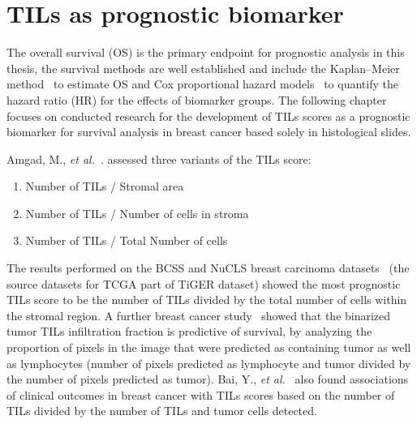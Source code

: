 \section{TILs as prognostic biomarker}
The overall survival (OS) is the primary endpoint for prognostic analysis in this thesis,
the survival methods are well established and include the Kaplan–Meier method~\cite{kaplan1958nonparametric} to estimate OS
and Cox proportional hazard models~\cite{https://doi.org/10.1111/j.2517-6161.1972.tb00899.x} to quantify the hazard ratio (HR) for the effects of biomarker
groups. The following chapter focuses on conducted research for the development of TILs scores as a
prognostic biomarker for survival analysis in breast cancer based solely in histological slides.

Amgad, M., \textit{et al.}~\cite{kos2020pitfalls, amgad2022mutils}. assessed three variants of the TILs score:
\begin{enumerate}
    \itemsep0em 
    \item Number of TILs / Stromal area 
    \item Number of TILs / Number of cells in stroma
    \item Number of TILs / Total Number of cells 
\end{enumerate}
The results performed on the BCSS and NuCLS breast carcinoma datasets~\cite{amgad2019structured, amgad2021nucls}
(the source datasets for TCGA part of TiGER dataset) showed the most prognostic TILs score to be the number of TILs
divided by the total number of cells within the stromal region.
A further breast cancer study~\cite{le2020utilizing} showed that the binarized tumor TILs infiltration fraction is
predictive of survival, by analyzing the proportion of pixels in the image that were predicted as containing
tumor as well as lymphocytes (number of pixels predicted as lymphocyte and tumor divided by the number of pixels
predicted as tumor).
Bai, Y., \textit{et al.}~\cite{bai2021open} also found associations of clinical outcomes in breast cancer with TILs scores based on
the number of TILs divided by the number of TILs and tumor cells detected.

